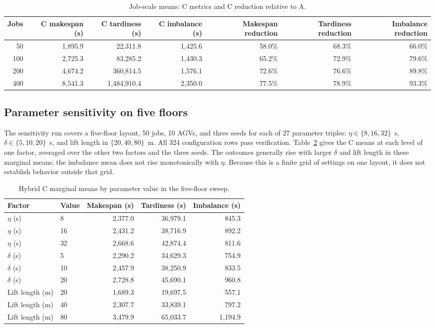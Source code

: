 \begin{table}[htbp]
\centering
\scriptsize
\caption{Job-scale means: C metrics and C reduction relative to A.}
\label{tab:job-scale}
\begin{tabular}{rrrrrrr}
\toprule
Jobs & C makespan (s) & C tardiness (s) & C imbalance (s) & Makespan reduction & Tardiness reduction & Imbalance reduction \\
\midrule
50  & 1,895.9 & 22,311.8 & 1,425.6 & 58.0\% & 68.3\% & 66.0\% \\
100 & 2,725.3 & 83,285.2 & 1,430.3 & 65.2\% & 72.9\% & 79.6\% \\
200 & 4,674.2 & 360,814.5 & 1,576.1 & 72.6\% & 76.6\% & 89.8\% \\
400 & 8,541.3 & 1,484,910.4 & 2,350.0 & 77.5\% & 78.9\% & 93.3\% \\
\bottomrule
\end{tabular}
\end{table}

\subsection{Parameter sensitivity on five floors}

The sensitivity run covers a five-floor layout, 50 jobs, 10 AGVs, and three
seeds for each of 27 parameter triples: $\eta\in\{8,16,32\}$~s,
$\delta\in\{5,10,20\}$~s, and lift length in $\{20,40,80\}$~m. All 324
configuration rows pass verification. Table~\ref{tab:sensitivity-c} gives
the C means at each level of one factor, averaged over the other two factors
and the three seeds.
The outcomes generally rise with larger $\delta$ and lift length in these
marginal means; the imbalance mean does not rise monotonically with $\eta$.
Because this is a finite grid of settings on one layout, it does not establish
behavior outside that grid.

\begin{table}[htbp]
\centering
\small
\caption{Hybrid C marginal means by parameter value in the five-floor sweep.}
\label{tab:sensitivity-c}
\begin{tabular}{llrrr}
\toprule
Factor & Value & Makespan (s) & Tardiness (s) & Imbalance (s) \\
\midrule
$\eta$ (s) & 8  & 2,377.0 & 36,979.1 & 845.3 \\
$\eta$ (s) & 16 & 2,431.2 & 38,716.9 & 892.2 \\
$\eta$ (s) & 32 & 2,668.6 & 42,874.4 & 811.6 \\
$\delta$ (s) & 5  & 2,290.2 & 34,629.3 & 754.9 \\
$\delta$ (s) & 10 & 2,457.9 & 38,250.9 & 833.5 \\
$\delta$ (s) & 20 & 2,728.8 & 45,690.1 & 960.8 \\
Lift length (m) & 20 & 1,689.3 & 19,697.5 & 557.1 \\
Lift length (m) & 40 & 2,307.7 & 33,839.1 & 797.2 \\
Lift length (m) & 80 & 3,479.9 & 65,033.7 & 1,194.9 \\
\bottomrule
\end{tabular}
\end{table}


